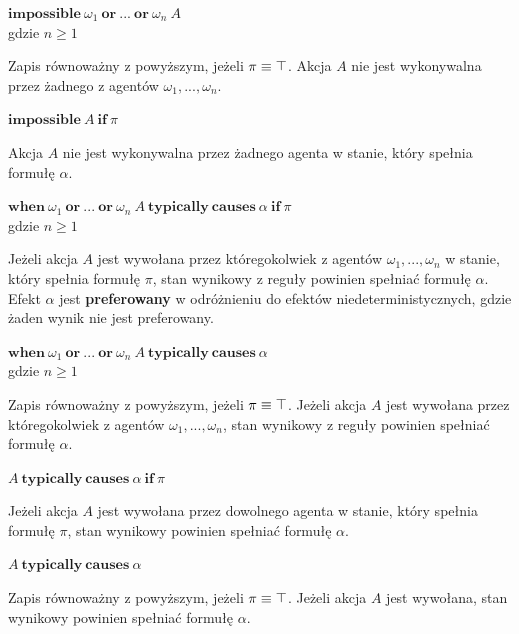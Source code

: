 \documentclass[11pt,a4paper]{article}
\def\tang{\ThisStyle{\abovebaseline[0pt]{\scalebox{-1}{$\SavedStyle\perp$}}}}
\begin{document}
    \begin{center}
        $\mathbf{impossible}~\omega_1~\mathbf{or}~...~\mathbf{or}~\omega_n~A$
        \\gdzie $n \geq 1$
    \end{center}
    Zapis równoważny z powyższym, jeżeli $\pi \equiv \tang$. Akcja $A$ nie jest wykonywalna przez żadnego z agentów $\omega_1, ..., \omega_n$.
    
    \begin{center}
        $\mathbf{impossible}~A~\mathbf{if}~\pi$
    \end{center}
    Akcja $A$ nie jest wykonywalna przez żadnego agenta w stanie, który spełnia formułę $\alpha$.
    
    \begin{center}
        $\mathbf{when}~\omega_1~\mathbf{or}~...~\mathbf{or}~\omega_n~A~\mathbf{typically~causes}~\alpha~\mathbf{if}~\pi$
        \\gdzie $n \geq 1$
    \end{center}
    Jeżeli akcja $A$ jest wywołana przez któregokolwiek z agentów $\omega_1, ..., \omega_n$ w stanie, który spełnia formułę $\pi$, stan wynikowy z reguły powinien spełniać formułę $\alpha$. Efekt $\alpha$ jest \textbf{preferowany} w odróżnieniu do efektów niedeterministycznych, gdzie żaden wynik nie jest preferowany.
    
    \begin{center}
        $\mathbf{when}~\omega_1~\mathbf{or}~...~\mathbf{or}~\omega_n~A~\mathbf{typically~causes}~\alpha$
        \\gdzie $n \geq 1$
    \end{center}
    Zapis równoważny z powyższym, jeżeli $\pi \equiv \tang$. Jeżeli akcja $A$ jest wywołana przez któregokolwiek z agentów $\omega_1, ..., \omega_n$, stan wynikowy z reguły powinien spełniać formułę $\alpha$.
    
    \begin{center}
        $A~\mathbf{typically~causes}~\alpha~\mathbf{if}~\pi$    
    \end{center}
    Jeżeli akcja $A$ jest wywołana przez dowolnego agenta w stanie, który spełnia formułę $\pi$, stan wynikowy powinien spełniać formułę $\alpha$.
    
    \begin{center}
        $A~\mathbf{typically~causes}~\alpha$
    \end{center}
    Zapis równoważny z powyższym, jeżeli $\pi \equiv \tang$. Jeżeli akcja $A$ jest wywołana, stan wynikowy powinien spełniać formułę $\alpha$.
    
\end{document}
